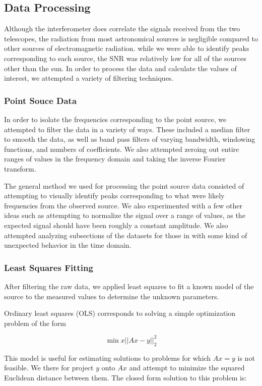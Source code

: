 \documentclass{article}
\begin{document}
  \subsection{Data Processing}
  Although the interferometer does correlate the signals received from the two
  telescopes, the radiation from most astronomical sources is negligible
  compared to other sources of electromagnetic radiation. while we were able to
  identify peaks corresponding to each source, the SNR was relatively low for
  all of the sources other than the sun. In order to process the data and
  calculate the values of interest, we attempted a variety of filtering
  techniques.

  \subsubsection{Point Souce Data}
  In order to isolate the frequencies corresponding to the point source, we
  attempted to filter the data in a variety of ways. These included a median
  filter to smooth the data, as well as band pass filters of varying bandwidth,
  windowing functions, and numbers of coefficients. We also attempted zeroing
  out entire ranges of values in the frequency domain and taking the inverse
  Fourier transform.

  The general method we used for processing the point source data consisted of
  attempting to visually identify peaks corresponding to what were likely
  frequencies from the observed source. We also experimented with a few other
  ideas such as attempting to normalize the signal over a range of values, as
  the expected signal should have been roughly a constant amplitude. We also
  attempted analyzing subsections of the datasets for those in with some kind of
  unexpected behavior in the time domain.

  \subsubsection{Least Squares Fitting}
  After filtering the raw data, we applied least squares to fit a known model
  of the source to the measured values to determine the unknown parameters.

  Ordinary least squares (OLS) corresponds to solving a simple optimization
  problem of the form

  \[\min{x} ||Ax - y||^2_2 \]

  This model is useful for estimating solutions to problems for which $Ax=y$ is
  not feasible. We there for project $y$ onto $Ax$ and attempt to minimize the
  squared Euclidean distance between them. The closed form solution to this
  problem is:
\end{document}
